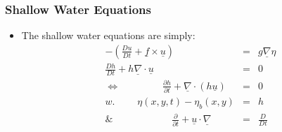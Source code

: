 
\subsubsection{Shallow Water Equations}
\label{sec:shallow_equation}

\begin{itemize}
    \item The shallow water equations are simply:
    \begin{eqnarray}
     -\left(\frac{Du}{Dt} + \underline{f}\times\underline{u} \right) &=& g \underline{\nabla} \eta  \\
 \frac{Dh}{Dt} + h \underline{\nabla}\cdot\underline{u} &=& 0\\
\Leftrightarrow  \;\quad\quad\quad\quad \frac{\partial h}{\partial t} + \underline{\nabla}\cdot (h\underline{u})&=& 0 \\
w. \;\quad\quad \eta(x, y, t) - \eta_{b}(x, y)  &=& h \\
\& \quad\quad\quad\quad\quad\quad \frac{\partial}{\partial t} + \underline{u}\cdot\underline{\nabla}   &=& \frac{D}{Dt}
    \end{eqnarray}
\end{itemize}
